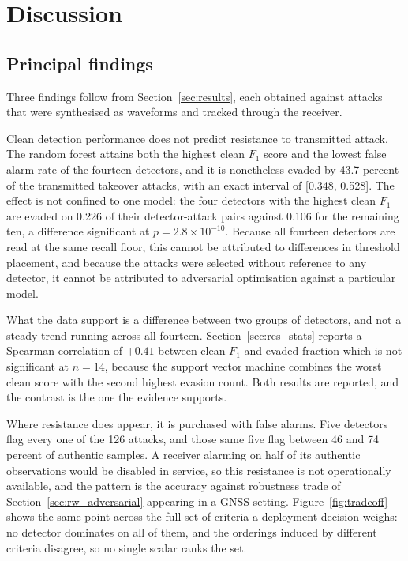\section{Discussion}
\label{sec:discussion}

\subsection{Principal findings}

Three findings follow from Section~\ref{sec:results}, each obtained against attacks that
were synthesised as waveforms and tracked through the receiver.

Clean detection performance does not predict resistance to transmitted attack. The random
forest attains both the highest clean $F_1$ score and the lowest false alarm rate of the
fourteen detectors, and it is nonetheless evaded by 43.7 percent of the transmitted
takeover attacks, with an exact interval of [0.348, 0.528]. The effect is not confined to
one model: the four detectors with the highest clean $F_1$ are evaded on 0.226 of their
detector-attack pairs against 0.106 for the remaining ten, a difference significant at
$p = 2.8 \times 10^{-10}$. Because all fourteen detectors are read at the same recall
floor, this cannot be attributed to differences in threshold placement, and because the
attacks were selected without reference to any detector, it cannot be attributed to
adversarial optimisation against a particular model.

What the data support is a difference between two groups of detectors, and not a steady
trend running across all fourteen. Section~\ref{sec:res_stats} reports a Spearman correlation of $+0.41$
between clean $F_1$ and evaded fraction which is not significant at $n = 14$, because the
support vector machine combines the worst clean score with the second highest evasion
count. Both results are reported, and the contrast is the one the
evidence supports.

Where resistance does appear, it is purchased with false alarms. Five detectors flag every
one of the 126 attacks, and those same five flag between 46 and 74 percent of authentic
samples. A receiver alarming on half of its authentic observations would be
disabled in service, so this resistance is not operationally available, and the pattern is
the accuracy against robustness trade of Section~\ref{sec:rw_adversarial} appearing in a
GNSS setting. Figure~\ref{fig:tradeoff} shows the same point across the full set of
criteria a deployment decision weighs: no detector dominates on all of them, and the
orderings induced by different criteria disagree, so no single scalar ranks the set.

